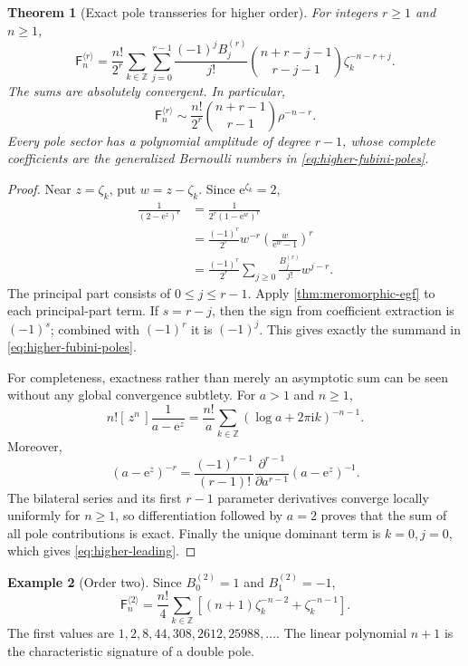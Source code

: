 \documentclass[11pt,a4paper,oneside]{article}
\newtheorem{theorem}{Theorem}[section]
\theoremstyle{definition}
\newtheorem{example}[theorem]{Example}
\theoremstyle{remark}
\newcommand{\Fub}{\mathsf{F}}
\newcommand{\Coeff}[3]{[\,#1^{#2}\,]#3}
\newcommand{\e}{\mathrm{e}}
\newcommand{\ii}{\mathrm{i}}
\begin{document}
\begin{theorem}[Exact pole transseries for higher order]
\label{thm:higher-fubini}
For integers $r\ge1$ and $n\ge1$,
\begin{equation}\label{eq:higher-fubini-poles}
 \boxed{\displaystyle
 \Fub_n^{\langle r\rangle}
 =\frac{n!}{2^r}\sum_{k\in\mathbb Z}
   \sum_{j=0}^{r-1}
   \frac{(-1)^jB_j^{(r)}}{j!}
   \binom{n+r-j-1}{r-j-1}
   \zeta_k^{-n-r+j}.}
\end{equation}
The sums are absolutely convergent.  In particular,
\begin{equation}\label{eq:higher-leading}
 \Fub_n^{\langle r\rangle}
 \sim\frac{n!}{2^r}
 \binom{n+r-1}{r-1}\rho^{-n-r}.
\end{equation}
Every pole sector has a polynomial amplitude of degree $r-1$, whose complete
coefficients are the generalized Bernoulli numbers in
\cref{eq:higher-fubini-poles}.
\end{theorem}

\begin{proof}
Near $z=\zeta_k$, put $w=z-\zeta_k$.  Since $\e^{\zeta_k}=2$,
\begin{align*}
 \frac{1}{(2-\e^z)^r}
 &=\frac{1}{2^r(1-\e^w)^r}\\
 &=\frac{(-1)^r}{2^r}w^{-r}
   \left(\frac{w}{\e^w-1}\right)^r\\
 &=\frac{(-1)^r}{2^r}
   \sum_{j\ge0}\frac{B_j^{(r)}}{j!}w^{j-r}.
\end{align*}
The principal part consists of $0\le j\le r-1$.  Apply
\cref{thm:meromorphic-egf} to each principal-part term.  If
$s=r-j$, then the sign from coefficient extraction is $(-1)^s$; combined
with $(-1)^r$ it is $(-1)^j$.  This gives exactly the summand in
\cref{eq:higher-fubini-poles}.

For completeness, exactness rather than merely an asymptotic sum can be seen
without any global convergence subtlety.  For $a>1$ and $n\ge1$,
\[
 n!\Coeff{z}{n}{\frac{1}{a-\e^z}}
 =\frac{n!}{a}\sum_{k\in\mathbb Z}
    (\log a+2\pi\ii k)^{-n-1}.
\]
Moreover,
\[
 (a-\e^z)^{-r}
 =\frac{(-1)^{r-1}}{(r-1)!}
   \frac{\partial^{r-1}}{\partial a^{r-1}}(a-\e^z)^{-1}.
\]
The bilateral series and its first $r-1$ parameter derivatives converge
locally uniformly for $n\ge1$, so differentiation followed by $a=2$ proves
that the sum of all pole contributions is exact.  Finally the unique dominant
term is $k=0,j=0$, which gives \cref{eq:higher-leading}.
\end{proof}

\begin{example}[Order two]
Since $B_0^{(2)}=1$ and $B_1^{(2)}=-1$,
\begin{equation}\label{eq:order-two}
 \Fub_n^{\langle2\rangle}
 =\frac{n!}{4}\sum_{k\in\mathbb Z}
 \left[(n+1)\zeta_k^{-n-2}+\zeta_k^{-n-1}\right].
\end{equation}
The first values are
\(
 1,2,8,44,308,2612,25988,\ldots
\).
The linear polynomial $n+1$ is the characteristic signature of a double
pole.
\end{example}
\end{document}
